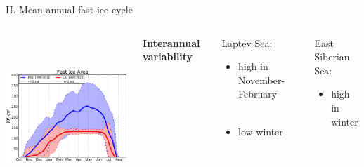 \documentclass[8pt]{beamer}
\begin{document}
\setwatermark{\fontsize{125pt}{125pt}\selectfont{}}
\begin{frame}[fragile]{II. Mean annual fast ice cycle}
	\begin{columns}
		\begin{center}
			\includegraphics[height=6cm]{./img/Mean_SeasonalCycle_ESSvsSELS.pdf}\\
		\end{center}
		\begin{center}
			\textbf{Interannual variability}\\~\\
		\end{center}
		\begin{block}{\centering Laptev Sea:}
			
			\begin{itemize}
				\item high in November-February\\~\\
				\item low winter
			\end{itemize}
		\end{block}
		
		\begin{block}{\centering East Siberian Sea:}
			\begin{itemize}
				\item high in winter
			\end{itemize}
		\end{block}
	\end{columns}
\end{frame}
\end{document}
